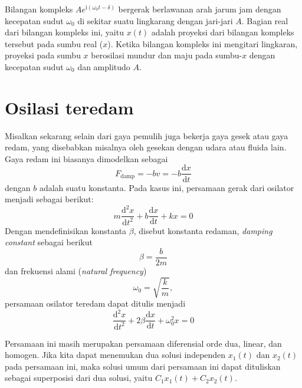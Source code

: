 Bilangan kompleks $Ae^{\mathrm{i}(\omega_0 t - \delta)}$ bergerak berlawanan arah jarum jam dengan
kecepatan sudut $\omega_0$ di sekitar suatu lingkarang dengan jari-jari $A$. Bagian real dari
bilangan kompleks ini, yaitu $x(t)$ adalah proyeksi dari bilangan kompleks tersebut pada
sumbu real ($x$). Ketika bilangan kompleks ini mengitari lingkaran, proyeksi pada sumbu $x$
berosilasi mundur dan maju pada sumbu-$x$ dengan kecepatan sudut $\omega_0$ dan amplitudo $A$.


\section{Osilasi teredam}

Misalkan sekarang selain dari gaya pemulih juga
bekerja gaya gesek atau gaya redam, yang disebabkan misalnya oleh
gesekan dengan udara atau fluida lain.
Gaya redam ini biasanya dimodelkan sebagai
\begin{equation}
F_{\mathrm{damp}} = -bv = -b\frac{\mathrm{d}x}{\mathrm{d}t}
\end{equation}
dengan $b$ adalah suatu konstanta.
Pada kasus ini, persamaan gerak dari osilator menjadi sebagai berikut:
\begin{equation}
m\frac{\mathrm{d}^{2}x}{\mathrm{d}t^{2}}+b\frac{\mathrm{d}x}{\mathrm{d}t}+kx=0
\end{equation}
Dengan mendefinisikan konstanta $\beta$, disebut konstanta redaman, \emph{damping constant}
sebagai berikut
\begin{equation}
\beta = \frac{b}{2m}
\end{equation}
dan frekuensi alami (\emph{natural frequency})
\begin{equation}
\omega_{0}=\sqrt{\frac{k}{m}},
\end{equation}
persamaan osilator teredam dapat ditulis menjadi
\begin{equation}
\frac{\mathrm{d}^{2}x}{\mathrm{d}t^{2}} + 2\beta \frac{\mathrm{d}x}{\mathrm{d}t} + \omega_{0}^{2}x = 0
\label{eq:Taylor_5_28}
\end{equation}

Persamaan ini masih merupakan persamaan diferensial orde dua, linear,
dan homogen. Jika kita dapat menemukan dua solusi independen $x_{1}(t)$
dan $x_{2}(t)$ pada persamaan ini, maka solusi umum dari persamaan
ini dapat dituliskan sebagai superposisi dari dua solusi, yaitu $C_{1}x_{1}(t)+C_{2}x_{2}(t)$.

